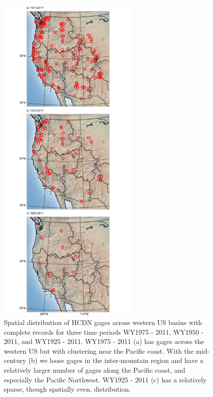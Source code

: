 \documentclass[final, double]{ua-thesis}
\begin{document}
\begin{figure}[ht]
\centering
\centerline{\includegraphics[width=70mm]{p1figures/s3.pdf}}
\caption{Spatial distribution of HCDN gages across western US basins with complete records for three time periods WY1975 - 2011, WY1950 - 2011, and WY1925 - 2011. WY1975 - 2011 (a) has gages across the western US but with clustering near the Pacific coast. With the mid-century (b) we loose gages in the inter-mountain region and have a relatively larger number of gages along the Pacific coast, and especially the Pacific Northwest. WY1925 - 2011 (c) has a relatively sparse, though spatially even, distribution.}
\label{sfig:gagedistribution}
\end{figure}
\end{document}
